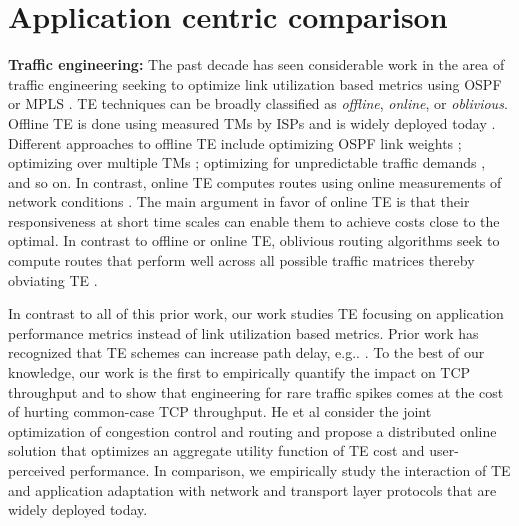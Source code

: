 {\section{Application centric comparison}
\label{sec:rel}



\textbf{Traffic engineering:}
The past decade has seen considerable work in the area of traffic engineering seeking to optimize link utilization based metrics using OSPF \cite{fortz2000internet} or MPLS \cite{MPLSIntro}.  TE techniques can be broadly classified as {\em offline}, {\em online}, or {\em oblivious}. Offline TE is done using measured TMs by ISPs and is widely deployed today \cite{rexford}. Different approaches to offline TE include optimizing OSPF link weights \cite{fortz2000internet}; optimizing over multiple TMs \cite{MultiTM};  optimizing  for unpredictable traffic demands \cite{COPE}, and so on. In contrast, online TE  computes routes using online measurements of network conditions \cite{MPLS2,COPE}. The main argument in favor of online TE is that their responsiveness at short time scales can enable them to achieve costs close to the optimal. In contrast to offline or online TE, oblivious routing algorithms seek to compute routes that perform well across all possible traffic matrices thereby obviating TE \cite{Cohen}. 

In contrast to all of this prior work, our work studies TE focusing on application performance metrics instead of link utilization based metrics.
Prior work has recognized that TE schemes can increase path delay, e.g.. \cite{TEXCP}.  To the best of our knowledge, our work is the first to empirically quantify the impact on TCP throughput and to show that engineering for rare traffic spikes comes at the cost of hurting common-case TCP throughput. He et al \cite{JointCCR2} consider the joint optimization of congestion control and routing and propose a distributed online solution that optimizes an aggregate utility function of TE cost and user-perceived performance. In comparison, we empirically study the interaction of TE and application adaptation with network and transport layer protocols that are widely deployed today.



}
